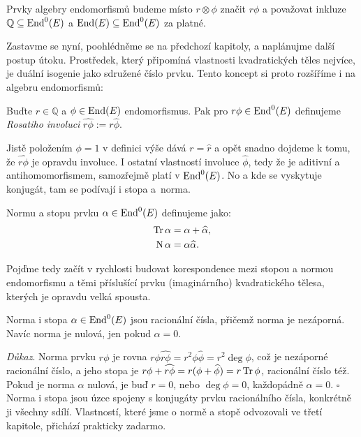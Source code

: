 \documentclass[12pt]{report}
\begin{document}
\begin{umluva}
Prvky algebry endomorfismů budeme místo $r \otimes \phi$ značit $r \phi$ a považovat inkluze $\mathbb{Q} \subseteq \operatorname{End}^0 (E)$ a $\operatorname{End}(E) \subseteq \operatorname{End}^0 (E)$ za platné.
\end{umluva}

Zastavme se nyní, poohlédněme se na předchozí kapitoly, a naplánujme další postup útoku. Prostředek, který připomíná vlastnosti kvadratických těles nejvíce, je duální isogenie jako sdružené číslo prvku. Tento koncept si proto rozšíříme i na algebru endomorfismů:
\begin{definice}
Buďte $r \in \mathbb{Q}$ a $\phi \in \operatorname{End}(E)$ endomorfismus. Pak pro $r \phi \in \operatorname{End}^0 (E)$ definujeme \textit{Rosatiho involuci} $\widehat{r \phi} := r \widehat{\phi}$.
\end{definice}
Jistě položením $\phi = 1$ v definici výše dává $r = \widehat{r}$ a opět snadno dojdeme k tomu, že $\widehat{r \phi}$ je opravdu involuce. I ostatní vlastností involuce $\widehat{\phi}$, tedy že je aditivní a antihomomorfismem, samozřejmě platí v $\operatorname{End}^0 (E)$. No a kde se vyskytuje konjugát, tam se podívají i stopa a~norma.
\begin{definice}
Normu a stopu prvku $\alpha \in \operatorname{End}^0(E)$ definujeme jako:
\begin{align*}
\operatorname{Tr} \alpha &= \alpha+\widehat{\alpha},\\
\operatorname{N} \alpha &= \alpha \widehat{\alpha}. 
\end{align*}
\end{definice}

Pojďme tedy začít v rychlosti budovat korespondence mezi stopou a normou endomorfismu a těmi příslušící prvku (imaginárního) kvadratického tělesa, kterých je opravdu velká spousta.

\begin{veta}
Norma i stopa $\alpha \in \operatorname{End}^0 (E)$ jsou racionální čísla, přičemž norma je nezáporná. Navíc norma je nulová, jen pokud $\alpha = 0$.
\end{veta}
\noindent \textit{Důkaz}. Norma prvku $r \phi$ je rovna $r \phi \widehat{r \phi} = r^2 \phi \widehat{\phi} = r^2 \deg \phi$, což je nezáporné racionální číslo, a jeho stopa je $r \phi + \widehat{r \phi} = r (\phi+\widehat{\phi}) = r \operatorname{Tr} \phi$, racionální číslo též. Pokud je norma $\alpha$ nulová, je buď $r=0$, nebo $\deg \phi = 0$, každopádně $\alpha = 0$. \hfill $\square$\\

Norma i stopa jsou úzce spojeny s konjugáty prvku racionálního čísla, konkrétně ji všechny sdílí. Vlastností, které jsme o normě a stopě odvozovali ve třetí kapitole, přichází prakticky zadarmo.
\end{document}

